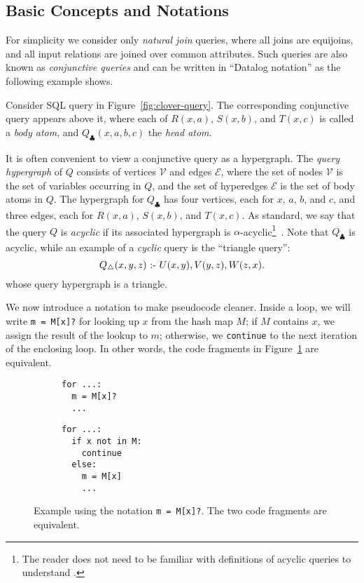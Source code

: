 \subsection{Basic Concepts and Notations}\label{sec:basic-concepts}

For simplicity we consider only {\em natural join} queries,
where all joins are equijoins, and all input relations
are joined over common attributes.
Such queries are also known as {\em conjunctive queries}
and can be written in ``Datalog notation'' as the following
example shows.

\begin{example} \label{ex:triangle}
  Consider SQL query in Figure~\ref{fig:clover-query}.
  The corresponding conjunctive query appears above it,
  where each of $R(x, a)$, $S(x, b)$, and $T(x, c)$
  is called a {\em body atom}, and $Q_\clubsuit(x, a, b, c)$
  the {\em head atom}.
\end{example}

It is often convenient to view a conjunctive query as
a hypergraph.  The \emph{query hypergraph} of $Q$ consists of vertices
$\mathcal{V}$ and edges $\mathcal{E}$, where the set of nodes
$\mathcal{V}$ is the set of variables occurring in $Q$, and the set of
hyperedges $\mathcal{E}$ is the set of body atoms in $Q$.
The hypergraph for $Q_\clubsuit$ has four vertices, each for
$x$, $a$, $b$, and $c$,
and three edges, each for $R(x, a)$, $S(x, b)$, and $T(x, c)$.
As standard, we
say that the query $Q$ is {\em acyclic} if its associated hypergraph
is $\alpha$-acyclic\footnote{The reader does not need to be familiar
  with definitions of acyclic queries to understand \FJ.}~\cite{DBLP:journals/jacm/Fagin83}.
Note that $Q_\clubsuit$ is acyclic,
while an example of a {\em cyclic} query is the ``triangle query'':
$$Q_\triangle(x, y, z) \text{ :- } U(x, y), V(y, z), W(z, x).$$
whose query hypergraph is a triangle.

We now introduce a notation to make pseudocode cleaner.
Inside a loop,
we will write \lstinline|m = M[x]?|
for looking up $x$ from the hash map $M$;
if $M$ contains $x$, we assign the result of the lookup
to $m$; otherwise, we \lstinline|continue| to the next iteration
of the enclosing loop.
In other words, the code fragments in Figure~\ref{fig:lookup-notation}
are equivalent.
\begin{figure}
  \begin{subfigure}[t]{0.5\linewidth}
    \begin{lstlisting}
for ...:
  m = M[x]?
  ...
\end{lstlisting}
  \end{subfigure}
  \begin{subfigure}[t]{.45\linewidth}
    \begin{lstlisting}
for ...:
  if x not in M: 
    continue
  else: 
    m = M[x]
    ...
\end{lstlisting}
  \end{subfigure}
  \caption{Example using the notation \lstinline|m = M[x]?|.
    The two code fragments are equivalent.}
  \label{fig:lookup-notation}
\end{figure}

